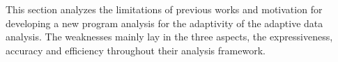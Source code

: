 This section analyzes the limitations of previous works and motivation for developing a new
program analysis for the adaptivity of the adaptive data analysis.
The weaknesses mainly lay in the three aspects, the expressiveness, accuracy and efficiency
throughout their analysis framework.
